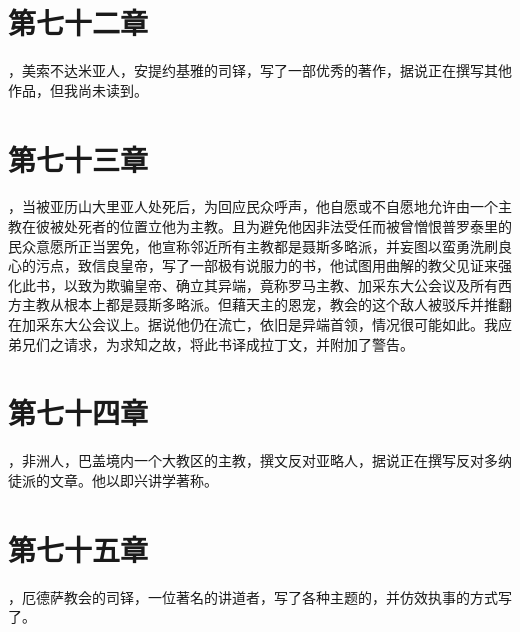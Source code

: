 
\section{第七十二章}

，美索不达米亚人，安提约基雅的司铎，写了一部优秀的著作，据说正在撰写其他作品，但我尚未读到。\par


\section{第七十三章}

，当被亚历山大里亚人处死后，为回应民众呼声，他自愿或不自愿地允许由一个主教在彼被处死者的位置立他为主教。且为避免他因非法受任而被曾憎恨普罗泰里的民众意愿所正当罢免，他宣称邻近所有主教都是聂斯多略派，并妄图以蛮勇洗刷良心的污点，致信良皇帝，写了一部极有说服力的书，他试图用曲解的教父见证来强化此书，以致为欺骗皇帝、确立其异端，竟称罗马主教、加采东大公会议及所有西方主教从根本上都是聂斯多略派。但藉天主的恩宠，教会的这个敌人被驳斥并推翻在加采东大公会议上。据说他仍在流亡，依旧是异端首领，情况很可能如此。我应弟兄们之请求，为求知之故，将此书译成拉丁文，并附加了警告。\par


\section{第七十四章}

，非洲人，巴盖境内一个大教区的主教，撰文反对亚略人，据说正在撰写反对多纳徒派的文章。他以即兴讲学著称。\par


\section{第七十五章}

，厄德萨教会的司铎，一位著名的讲道者，写了各种主题的，并仿效执事的方式写了。\par

